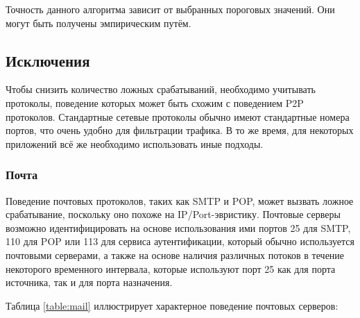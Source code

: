 \documentclass[bachelor, och, coursework]{SCWorks}
\begin{document}




Точность данного алгоритма зависит от выбранных пороговых значений. Они могут быть получены эмпирическим путём.



\subsection{Исключения}
Чтобы снизить количество ложных срабатываний, необходимо учитывать протоколы, поведение которых может быть схожим с поведением P2P протоколов. Стандартные сетевые протоколы обычно имеют стандартные номера портов, что очень удобно для фильтрации трафика. В то же время, для некоторых приложений всё же необходимо использовать иные подходы.

\subsubsection{Почта}
Поведение почтовых протоколов, таких как SMTP и POP, может вызвать ложное срабатывание, поскольку оно похоже на IP/Port-эвристику. Почтовые серверы возможно идентифицировать на основе использования ими портов 25 для SMTP, 110 для POP или 113 для сервиса аутентификации, который обычно используется почтовыми серверами, а также на основе наличия различных потоков в течение некоторого временного интервала, которые используют порт 25 как для порта источника, так и для порта назначения.

Таблица \ref{table:mail} иллюстрирует характерное поведение почтовых серверов:
\end{document}
